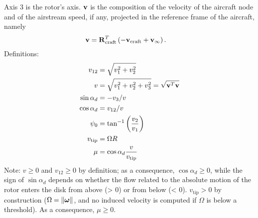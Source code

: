 %
%
%
%
%
% 
%
%
%

Axis 3 is the rotor's axis.
$\bm{\mathbf{v}}$ is the composition of the velocity of the aircraft node
and of the airstream speed, if any, projected in the reference frame
of the aircraft, namely
\begin{align}
	\bm{\mathbf{v}}
	&=
	\bm{\mathbf{R}}_\text{craft}^T \left( 
		- \bm{\mathbf{v}}_\text{craft}
		+ \bm{\mathbf{v}}_\infty
	 \right)
	.
\end{align}
Definitions:
\begin{subequations}
\begin{align}
	v_{12}
	&=
	\sqrt{v_1^2 + v_2^2}
	\\
	v
	&=
	\sqrt{v_1^2 + v_2^2 + v_3^2}
	= \sqrt{\bm{\mathbf{v}}^T \bm{\mathbf{v}}}
	\\
	\sin\alpha_d
	&=
	-v_3/v
	\\
	\cos\alpha_d
	&=
	v_{12}/v
	\\
	\psi_0
	&=
	\tan^{-1}\left( \frac{v_2}{v_1} \right)
	\\
	v_\text{tip}
	&=
	\Omega R
	\\
	\mu
	&=
	\cos\alpha_d \frac{v}{v_\text{tip}}
\end{align}
\end{subequations}
Note: $v \ge 0$ and $v_{12} \ge 0$ by definition;
as a consequence, $\cos\alpha_d \ge 0$,
while the sign of $\sin\alpha_d$ depends on whether
the flow related to the absolute motion of the rotor
enters the disk from above (> 0) or from below (< 0).
$v_\text{tip} > 0$ by construction
($\Omega = \left\| \bm{\mathbf{\omega}} \right\|$, and no induced velocity
is computed if $\Omega$ is below a threshold).
As a consequence, $\mu \ge 0$.


